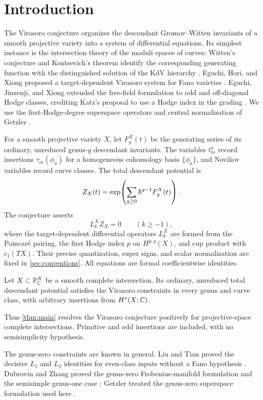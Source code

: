 \section{Introduction}\label{sec:introduction}

The Virasoro conjecture organizes the descendant Gromov--Witten invariants of a smooth projective variety into a system of differential equations. Its simplest instance is the intersection theory of the moduli spaces of curves: Witten's conjecture and Kontsevich's theorem identify the corresponding generating function with the distinguished solution of the KdV hierarchy \cite{Witten1991,Kontsevich1992}. Eguchi, Hori, and Xiong proposed a target-dependent Virasoro system for Fano varieties \cite{EHX1997}. Eguchi, Jinzenji, and Xiong extended the free-field formulation to odd and off-diagonal Hodge classes, crediting Katz's proposal to use a Hodge index in the grading \cite{EJX1998}. We use the first-Hodge-degree superspace operators and central normalization of Getzler \cite{Getzler1999}.

For a smooth projective variety $X$, let $F_g^X(t)$ be the generating series of its ordinary, unreduced genus-$g$ descendant invariants. The variables $t_m^a$ record insertions $\tau_m(\phi_a)$ for a homogeneous cohomology basis $\{\phi_a\}$, and Novikov variables record curve classes. The total descendant potential is
\[
 Z_X(t)=\exp\!\left(\sum_{g\geq0}\hbar^{g-1}F_g^X(t)\right).
\]
The conjecture asserts
\[
 L_k^X Z_X=0\qquad(k\geq-1),
\]
where the target-dependent differential operators $L_k^X$ are formed from the Poincar\'e pairing, the first Hodge index $p$ on $H^{p,q}(X)$, and cup product with $c_1(TX)$. Their precise quantization, super signs, and scalar normalization are fixed in \cref{sec:conventions}. All equations are formal coefficientwise identities.

\begin{theorem}\label{thm:main}
Let \(X\subset\mathbb P^N_\mathbb C\) be a smooth complete intersection. Its ordinary, unreduced total descendant potential satisfies the Virasoro constraints in every genus and curve class, with arbitrary insertions from \(H^*(X;\mathbb C)\).
\end{theorem}

Thus \cref{thm:main} resolves the Virasoro conjecture positively for projective-space complete intersections. Primitive and odd insertions are included, with no semisimplicity hypothesis.

The genus-zero constraints are known in general. Liu and Tian proved the decisive $L_1$ and $L_2$ identities for even-class inputs without a Fano hypothesis \cite[Theorem~0.2]{LiuTian1998}. Dubrovin and Zhang proved the genus-zero Frobenius-manifold formulation and the semisimple genus-one case \cite[Main Theorem]{DubrovinZhang1999}; Getzler treated the genus-zero superspace formulation used here \cite[Section~4]{Getzler1999}.

